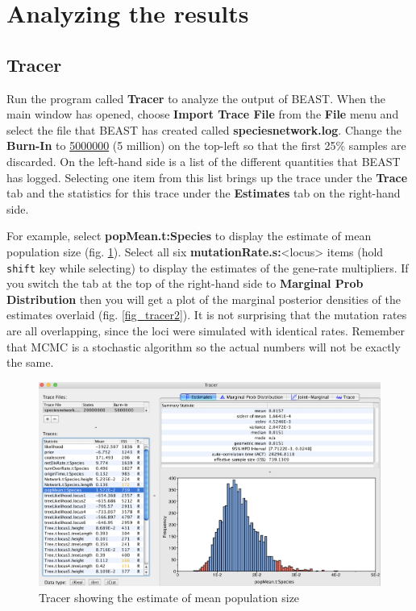 \documentclass[11pt]{article}
\begin{document}
\section*{Analyzing the results}

\subsection*{Tracer}

Run the program called \textbf{Tracer} to analyze the output of BEAST. When the main window has opened, choose \textbf{Import Trace File} from the \textbf{File} menu and select the file that BEAST has created called \textbf{speciesnetwork.log}. Change the \textbf{Burn-In} to \underline{5000000} (5 million) on the top-left so that the first 25\% samples are discarded.
On the left-hand side is a list of the different quantities that BEAST has logged. Selecting one item from this list brings up the trace under the \textbf{Trace} tab and the statistics for this trace under the \textbf{Estimates} tab on the right-hand side.

For example, select \textbf{popMean.t:Species} to display the estimate of mean population size (fig. \ref{fig_tracer1}). Select all six \textbf{mutationRate.s:}<locus> items (hold \texttt{shift} key while selecting) to display the estimates of the gene-rate multipliers. If you switch the tab at the top of the right-hand side to {\bf Marginal Prob Distribution} then you will get a plot of the marginal posterior densities of the estimates overlaid (fig. \ref{fig_tracer2}). It is not surprising that the mutation rates are all overlapping, since the loci were simulated with identical rates.
Remember that MCMC is a stochastic algorithm so the actual numbers will not be exactly the same.

\begin{figure}[h]
\center
\includegraphics[width=1.0\textwidth]{figs/fig10_tracer1.png}
\caption{Tracer showing the estimate of mean population size}
\label{fig_tracer1}
\end{figure}
\end{document}
